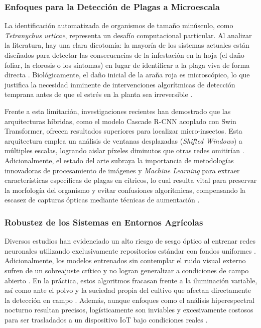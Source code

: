 \documentclass[12pt,letterpaper]{article}
\begin{document}
\subsubsection{Enfoques para la Detección de Plagas a Microescala}

La identificación automatizada de organismos de tamaño minúsculo, como \textit{Tetranychus urticae}, representa un desafío computacional particular. Al analizar la literatura, hay una clara dicotomía: la mayoría de los sistemas actuales están diseñados para detectar las consecuencias de la infestación en la hoja (el daño foliar, la clorosis o los síntomas) en lugar de identificar a la plaga viva de forma directa \cite{gonzalezgonzalez2021}. Biológicamente, el daño inicial de la araña roja es microscópico, lo que justifica la necesidad inminente de intervenciones algorítmicas de detección temprana antes de que el estrés en la planta sea irreversible \cite{neto2026early}.

Frente a esta limitación, investigaciones recientes han demostrado que las arquitecturas híbridas, como el modelo Cascade R-CNN acoplado con Swin Transformer, ofrecen resultados superiores para localizar micro-insectos. Esta arquitectura emplea un análisis de ventanas desplazadas (\textit{Shifted Windows}) a múltiples escalas, logrando aislar píxeles diminutos que otras redes omitirían \cite{li2022cascade}. Adicionalmente, el estado del arte subraya la importancia de metodologías innovadoras de procesamiento de imágenes y \textit{Machine Learning} para extraer características específicas de plagas en cítricos, lo cual resulta vital para preservar la morfología del organismo y evitar confusiones algorítmicas, compensando la escasez de capturas ópticas mediante técnicas de aumentación \cite{valderrama2025aleurothrixus}.

\subsubsection{Robustez de los Sistemas en Entornos Agrícolas}

Diversos estudios han evidenciado un alto riesgo de sesgo óptico al entrenar redes neuronales utilizando exclusivamente repositorios estándar con fondos uniformes \cite{sun2025deit}. Adicionalmente, los modelos entrenados sin contemplar el ruido visual externo sufren de un sobreajuste crítico y no logran generalizar a condiciones de campo abierto \cite{mallick2025review}. En la práctica, estos algoritmos fracasan frente a la iluminación variable, así como ante el polvo y la suciedad propia del cultivo que afectan directamente la detección en campo \cite{cunha2024psyllid}. Además, aunque enfoques como el análisis hiperespectral nocturno resultan precisos, logísticamente son inviables y excesivamente costosos para ser trasladados a un dispositivo IoT bajo condiciones reales \cite{nansen2024methods}.
\end{document}
